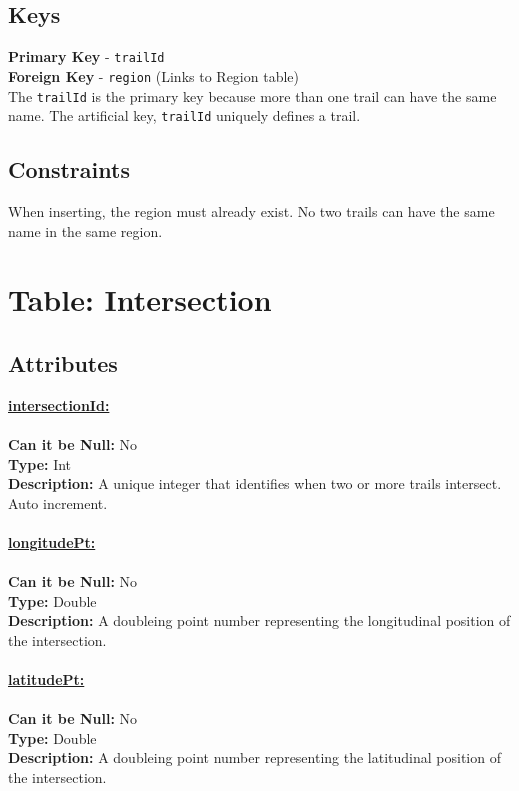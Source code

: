\subsection{Keys}
\textbf{Primary Key} - \texttt{trailId}\\
\textbf{Foreign Key} - \texttt{region} (Links to Region table)\\
The \texttt{trailId} is the primary key because more than one trail can have the 
same name. The artificial key, \texttt{trailId} uniquely defines a trail.

\subsection{Constraints}
When inserting, the region must already exist. No two trails can have the same name in
the same region.




\newpage
\section{Table: Intersection}
\subsection{Attributes}
\textbf{\underline{intersectionId:}}\\
\\
\textbf{Can it be Null:} No \\
\textbf{Type:} Int\\
\textbf{Description:} A unique integer that identifies when two or more
trails intersect. Auto increment.\\\\
\textbf{\underline{longitudePt:}}\\
\\
\textbf{Can it be Null:} No\\
\textbf{Type:} Double\\
\textbf{Description:} A doubleing point number representing the 
longitudinal position of the intersection.\\\\
\textbf{\underline{latitudePt:}}\\
\\
\textbf{Can it be Null:} No\\
\textbf{Type:} Double\\
\textbf{Description:} A doubleing point number representing the 
latitudinal position of the intersection.\\\\
